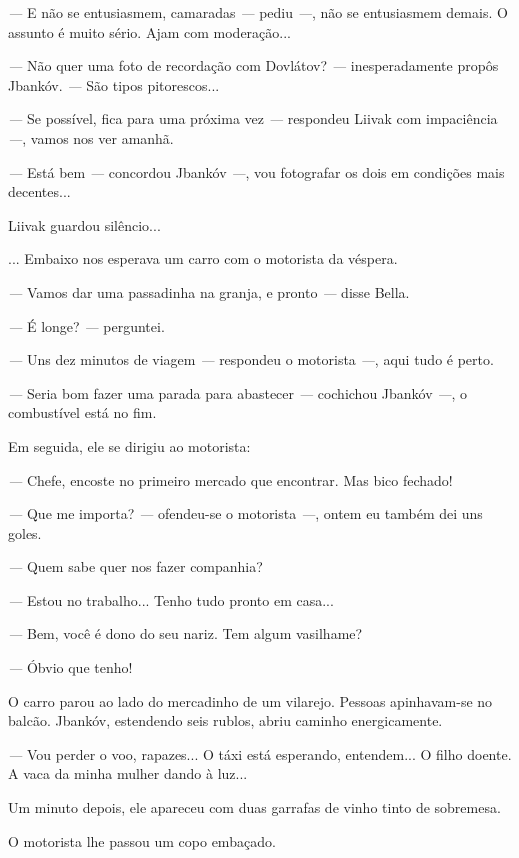 \emph{---} E não se entusiasmem, camaradas \emph{---} pediu \emph{---},
não se entusiasmem demais. O assunto é muito sério. Ajam com
moderação...

\emph{---} Não quer uma foto de recordação com Dovlátov? \emph{---}
inesperadamente propôs Jbankóv. \emph{---} São tipos pitorescos...

\emph{---} Se possível, fica para uma próxima vez \emph{---} respondeu
Liivak com impaciência\emph{---}, vamos nos ver amanhã.

\emph{---} Está bem \emph{---} concordou Jbankóv \emph{---}, vou
fotografar os dois em condições mais decentes...

Liivak guardou silêncio...

... Embaixo nos esperava um carro com o motorista da véspera.

\emph{---} Vamos dar uma passadinha na granja, e pronto \emph{---} disse
Bella.

\emph{---} É longe? \emph{---} perguntei.

\emph{---} Uns dez minutos de viagem \emph{---} respondeu o motorista
\emph{---}, aqui tudo é perto.

\emph{---} Seria bom fazer uma parada para abastecer \emph{---}
cochichou Jbankóv \emph{---}, o combustível está no fim.

Em seguida, ele se dirigiu ao motorista:

\emph{---} Chefe, encoste no primeiro mercado que encontrar. Mas bico
fechado!

\emph{---} Que me importa? \emph{---} ofendeu-se o motorista \emph{---},
ontem eu também dei uns goles.

\emph{---} Quem sabe quer nos fazer companhia?

\emph{---} Estou no trabalho... Tenho tudo pronto em casa...

\emph{---} Bem, você é dono do seu nariz. Tem algum vasilhame?

\emph{---} Óbvio que tenho!

O carro parou ao lado do mercadinho de um vilarejo. Pessoas apinhavam-se
no balcão. Jbankóv, estendendo seis rublos, abriu caminho energicamente.

\emph{---} Vou perder o voo, rapazes... O táxi está esperando,
entendem... O filho doente. A vaca da minha mulher dando à luz...

Um minuto depois, ele apareceu com duas garrafas de vinho tinto de
sobremesa.

O motorista lhe passou um copo embaçado.

